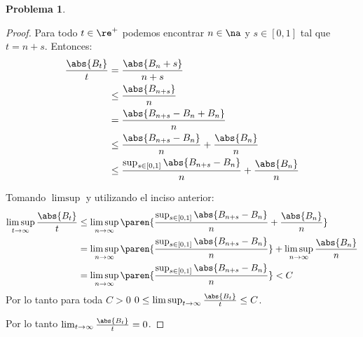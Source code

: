\documentclass[a5paper,oneside]{amsart}
\theoremstyle{plain}
\theoremstyle{definition}
\newtheorem{problema}{Problema}
\begin{document}
\begin{problema}
\begin{enumerate}
\begin{proof}
Para todo $t\in\re^+$ podemos encontrar $n\in\na$ y $s\in [0,1]$ tal que $t=n+s$. Entonces:
\begin{align}
\frac{\abs{B_t}}{t}&=\frac{\abs{B_n+s}}{n+s}\notag \\
& \leq \frac{\abs{B_{n+s}}}{n}\notag \\
&=\frac{\abs{B_{n+s}-B_n+B_n}}{n}\notag \\
&\leq \frac{\abs{B_{n+s}-B_n}}{n}+\frac{\abs{B_n}}{n}\notag \\
&\leq \frac{\sup_{s \in[0,1]}{\abs{B_{n+s}-B_n}}}{n}+\frac{\abs{B_n}}{n} \notag
\end{align}

Tomando $\limsup$ y utilizando el inciso anterior:
\begin{align}
\limsup_{t\to\infty }\frac{\abs{B_t}}{t} &\leq \limsup_{n \to \infty}\paren{ \frac{\sup_{s \in[0,1]}{\abs{B_{n+s}-B_n}}}{n}+\frac{\abs{B_n}}{n}} \notag\\
&=\limsup_{n \to \infty}\paren{ \frac{\sup_{s \in[0,1]}{\abs{B_{n+s}-B_n}}}{n}}+\limsup_{n \to \infty}{\frac{\abs{B_n}}{n}} \notag\\
&=\limsup_{n \to \infty}\paren{ \frac{\sup_{s \in[0,1]}{\abs{B_{n+s}-B_n}}}{n}} < C \notag
\end{align}
Por lo tanto para toda $C > 0$ $0\leq\limsup_{t\to\infty }\frac{\abs{B_t}}{t}\leq C $.

Por lo tanto $\lim_{t\to\infty }\frac{\abs{B_t}}{t} =0$.
\end{proof}
\end{enumerate}
\end{problema}
%
\end{document}
